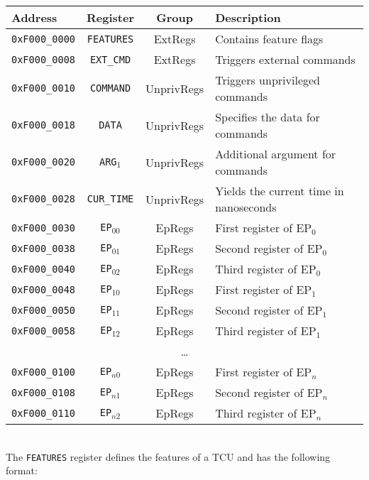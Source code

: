 \documentclass[a4paper,11pt]{article}
\begin{document}
\vspace{2ex}
\noindent
\begin{tabular}{ p{3cm} | c | c | l }
  \textbf{Address} & \textbf{Register} & \textbf{Group} & \textbf{Description} \\
  \hline
  \hline
  \texttt{0xF000\_0000} & \texttt{FEATURES} & ExtRegs & Contains feature flags \\
  \hline
  \texttt{0xF000\_0008} & \texttt{EXT\_CMD} & ExtRegs & Triggers external commands \\
  \hline
  \hline
  \texttt{0xF000\_0010} & \texttt{COMMAND} & UnprivRegs & Triggers unprivileged commands \\
  \hline
  \texttt{0xF000\_0018} & \texttt{DATA} & UnprivRegs & Specifies the data for commands \\
  \hline
  \texttt{0xF000\_0020} & \texttt{ARG$_1$} & UnprivRegs & Additional argument for commands \\
  \hline
  \texttt{0xF000\_0028} & \texttt{CUR\_TIME} & UnprivRegs & Yields the current time in nanoseconds \\
  \hline
  \hline
  \texttt{0xF000\_0030} & \texttt{EP$_{00}$} & EpRegs & First register of EP$_0$ \\
  \texttt{0xF000\_0038} & \texttt{EP$_{01}$} & EpRegs & Second register of EP$_0$ \\
  \texttt{0xF000\_0040} & \texttt{EP$_{02}$} & EpRegs & Third register of EP$_0$ \\
  \hline
  \texttt{0xF000\_0048} & \texttt{EP$_{10}$} & EpRegs & First register of EP$_1$ \\
  \texttt{0xF000\_0050} & \texttt{EP$_{11}$} & EpRegs & Second register of EP$_1$ \\
  \texttt{0xF000\_0058} & \texttt{EP$_{12}$} & EpRegs & Third register of EP$_1$ \\
  \hline
  \multicolumn{4}{c}{\dots} \\
  \hline
  \texttt{0xF000\_0100} & \texttt{EP$_{n0}$} & EpRegs & First register of EP$_{n}$ \\
  \texttt{0xF000\_0108} & \texttt{EP$_{n1}$} & EpRegs & Second register of EP$_{n}$ \\
  \texttt{0xF000\_0110} & \texttt{EP$_{n2}$} & EpRegs & Third register of EP$_{n}$ \\
\end{tabular}\\[1em]

\noindent The \texttt{FEATURES} register defines the features of a TCU and has the following format:
\end{document}
